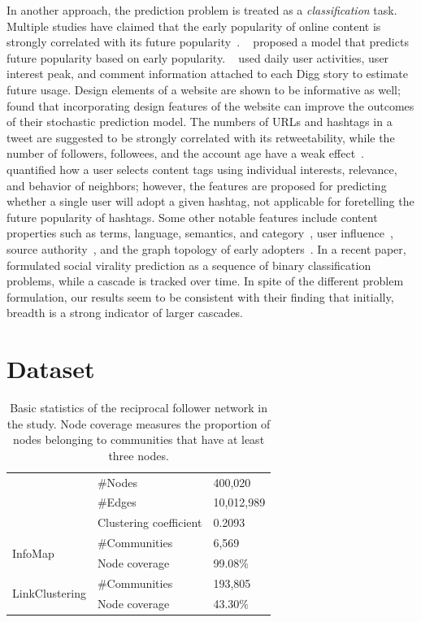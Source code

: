 \documentclass[letterpaper]{article}
\begin{document}
In another approach, the prediction problem is treated as a
\emph{classification} task. Multiple studies have claimed that the early popularity
of online content is strongly correlated with its future
popularity~\cite{Jamali2009digging,Szabo2010pred,Lerman2010www}. %
\citeauthor{Szabo2010pred}~ proposed a model that predicts future popularity based on early popularity. \citeauthor{Jamali2009digging}~ used daily user
activities, user interest peak, and comment information attached to each Digg
story to estimate future usage. Design elements of
a website are shown to be informative as well; \citeauthor{Lerman2010www}~ found that
incorporating design features of the website can improve
the outcomes of their stochastic prediction model.
The numbers of URLs and hashtags in a tweet are suggested to be strongly correlated with its retweetability, while the number of followers, followees, and the account age have a weak effect~\cite{Suh2010}. \citeauthor{Mei2012tags}~ quantified how a user selects content tags using individual interests, relevance, and behavior of neighbors; however, the features are proposed for predicting whether a single user will adopt a given hashtag, not applicable for foretelling the future popularity of hashtags.
Some other notable features include content properties such as terms, language, semantics, and category~\cite{tsur2012wsdm}, user influence~\cite{bakshy_everyones_2011,Salganik2006music}, source authority~\cite{Bandari2012pred}, and the graph topology of early adopters~\cite{romero2011popu,ma2013predicting}.
In a recent paper, \citeauthor{Cheng14CanCascadesBePredicted}~ formulated social virality prediction as a sequence of binary classification problems, while a cascade is tracked over time. In spite of the different problem formulation, our results seem to be consistent with their finding that initially, breadth is a strong indicator of larger cascades.


\section{Dataset}

\begin{table}
\caption{Basic statistics of the reciprocal follower network in the study. Node coverage measures the proportion of nodes belonging to communities that have at least three nodes.}
	\centering
	\begin{tabular}{ p{2cm} l >{\hfill}p{2cm}}
	\hline
	& \#Nodes  &  400,020 \\
	& \#Edges  & 10,012,989 \\
	& Clustering coefficient &  0.2093 \\
	\hline
	\multirow{2}{*}{InfoMap} & \#Communities &  6,569 \\
	& Node coverage & 99.08\% \\
	\multirow{2}{*}{LinkClustering} & \#Communities & 193,805\\
	& Node coverage & 43.30\% \\
	\hline
	\end{tabular}
\label{table:dataset}
\end{table}
\end{document}
